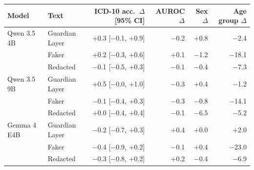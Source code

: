 \begin{tabular}{llrrrr}
\toprule
Model & Text & ICD-10 acc.\ $\Delta$ [95\% CI] & AUROC $\Delta$ & Sex $\Delta$ & Age group $\Delta$\\
\midrule
Qwen 3.5 4B & Guardian Layer & $+$0.3 [$-$0.1, $+$0.9] & $-$0.2 & $+$0.8 & $-$2.4\\
 & Faker & $+$0.2 [$-$0.3, $+$0.6] & $+$0.1 & $-$1.2 & $-$18.1\\
 & Redacted & $-$0.1 [$-$0.5, $+$0.3] & $-$0.1 & $-$0.4 & $-$7.3\\
\addlinespace
Qwen 3.5 9B & Guardian Layer & $+$0.5 [$-$0.0, $+$1.0] & $-$0.3 & $+$0.4 & $-$1.2\\
 & Faker & $-$0.1 [$-$0.4, $+$0.3] & $-$0.3 & $-$0.8 & $-$14.1\\
 & Redacted & $+$0.0 [$-$0.4, $+$0.4] & $-$0.1 & $-$6.5 & $-$5.2\\
\addlinespace
Gemma 4 E4B & Guardian Layer & $-$0.2 [$-$0.7, $+$0.3] & $+$0.4 & $+$0.0 & $+$2.0\\
 & Faker & $-$0.4 [$-$0.9, $+$0.2] & $-$0.1 & $+$0.4 & $-$23.0\\
 & Redacted & $-$0.3 [$-$0.8, $+$0.2] & $+$0.2 & $-$0.4 & $-$6.9\\
\bottomrule
\end{tabular}
